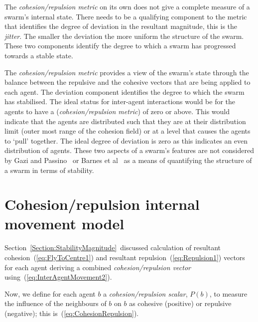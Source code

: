 \documentclass{ieeeaccess}
\begin{document}
The \emph{cohesion/repulsion metric} on its own does not give a complete measure of a swarm's internal state. There needs to be a qualifying component to the metric that identifies the degree of deviation in the resultant magnitude, this is the \emph{jitter}. The smaller the deviation the more uniform the structure of the swarm. These two components identify the degree to which a swarm has progressed towards a stable state.
 
The \emph{cohesion/repulsion metric} provides a view of the swarm's state through the balance between the repulsive and the cohesive vectors that are being applied to each agent. The deviation component identifies the degree to which the swarm has stabilised. The ideal status for inter-agent interactions would be for the agents to have a (\emph{cohesion/repulsion metric}) of zero or above. This would indicate that the agents are distributed such that they are at their distribution limit (outer most range of the cohesion field) or at a level that causes the agents to `pull' together. The ideal degree of deviation is zero as this indicates an even distribution of agents. These two aspects of a swarm's features are not considered by Gazi and Passino~\cite{GP:11} or Barnes et al~\cite{BFV:07} as a means of quantifying the structure of a swarm in terms of stability.

\section{Cohesion/repulsion internal movement model}\label{Section:StabilityModel}
Section~\ref{Section:StabilityMagnitude}~discussed calculation of resultant cohesion~(\ref{eq:FlyToCentre1}) and resultant repulsion~(\ref{eq:Repulsion1}) vectors for each agent deriving a combined \emph{cohesion/repulsion vector} using~(\ref{eq:InterAgentMovement2}). 


Now, we define for each agent $b$ a \emph{cohesion/repulsion scalar}, $P(b)$, to measure the influence of the neighbours of $b$ on $b$ as cohesive (positive) or repulsive (negative); this is~(\ref{eq:CohesionRepulsion}).
\end{document}
